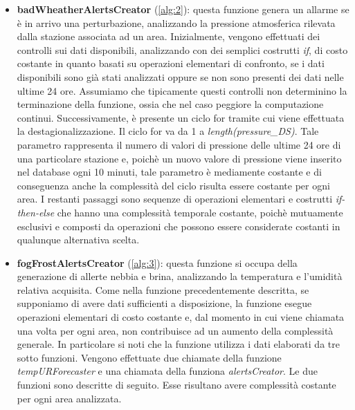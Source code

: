 \begin{itemize}
	\item \textbf{badWheatherAlertsCreator} (\Alg\ref{alg:2}): questa funzione genera un allarme se è in arrivo una perturbazione, analizzando la pressione atmosferica rilevata dalla stazione associata ad un area. Inizialmente, vengono effettuati dei controlli sui dati disponibili, analizzando con dei semplici costrutti \textit{if}, di costo costante in quanto basati su operazioni elementari di confronto, se i dati disponibili sono già stati analizzati oppure se non sono presenti dei dati nelle ultime 24 ore. Assumiamo che tipicamente questi controlli non determinino la terminazione della funzione, ossia che nel caso peggiore la computazione continui. Successivamente, è presente un ciclo for tramite cui viene effettuata la destagionalizzazione. Il ciclo for va da 1 a \textit{length(pressure\_DS)}. Tale parametro rappresenta il numero di valori di pressione delle ultime 24 ore di una particolare stazione e, poichè un nuovo valore di pressione viene inserito nel database ogni 10 minuti, tale parametro è mediamente costante e di conseguenza anche la complessità del ciclo risulta essere costante per ogni area. I restanti passaggi sono sequenze di operazioni elementari e costrutti \textit{if- then-else} che hanno una complessità temporale costante, poichè mutuamente esclusivi e composti da operazioni che possono essere considerate costanti in qualunque alternativa scelta.
	
	\item \textbf{fogFrostAlertsCreator} (\Alg\ref{alg:3}): questa funzione si occupa della generazione di allerte nebbia e brina, analizzando la temperatura e l'umidità relativa acquisita. Come nella funzione precedentemente descritta, se supponiamo di avere dati sufficienti a disposizione, la funzione esegue operazioni elementari di costo costante e, dal momento in cui viene chiamata una volta per ogni area, non contribuisce ad un aumento della complessità generale. In particolare si noti che la funzione utilizza i dati elaborati da tre sotto funzioni. Vengono effettuate due chiamate della funzione \textit{tempURForecaster} e una chiamata della funziona \textit{alertsCreator}. Le due funzioni sono descritte di seguito. Esse risultano avere complessità costante per ogni area analizzata.
	

\end{itemize}
